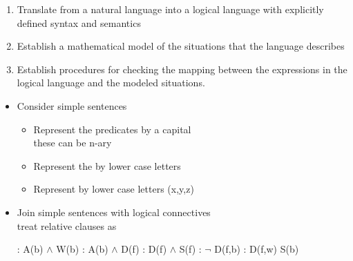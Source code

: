 \documentclass[headrule,footrule]{foils}
\begin{document}

\begin{enumerate}
\item Translate from a natural language into a logical language
  with explicitly defined syntax and semantics
\item Establish a mathematical model of the situations that the
  language describes
\item Establish procedures for checking the mapping between the
  expressions in the logical language and the modeled situations.
\end{enumerate}


\begin{itemize}
\item Consider simple sentences
  \begin{itemize}
  \item Represent the predicates by a capital 
    \\ these can be n-ary
  \item Represent the  by lower case letters
  \item Represent  by lower case letters (x,y,z)
  \end{itemize}
\item Join simple sentences with logical connectives
\\ treat relative clauses as 
  \begin{exe}
    \ex {}: A(b) $\wedge$ W(b)
    \ex {}: A(b) $\wedge$ D(f)
    \ex {}: D(f) $\wedge$ S(f)
    \ex {}: $\neg$ D(f,b)
    \ex {}: D(f,w) \into S(b)
  \end{exe}
\end{itemize}

\end{document}
